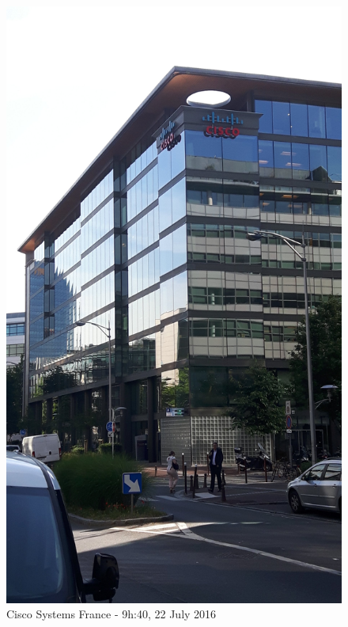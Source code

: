 \begin{figure}

\begin{center}

\includegraphics[scale = 0.1]{Pictures/cisco.jpg}

\caption{Cisco Systems France - 9h:40, 22 July 2016} \label{cisco} 

\end{center}

\end{figure}


